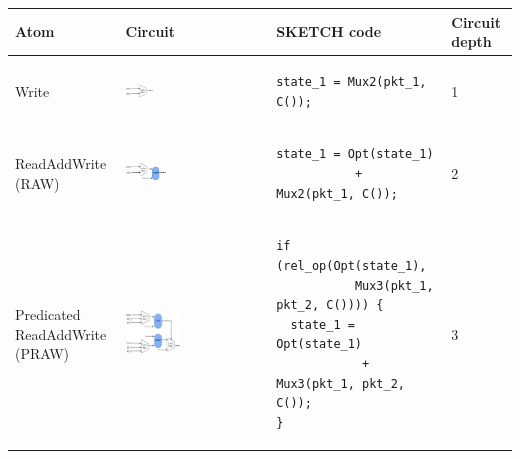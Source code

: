 \begin{scriptsize}
\begin{longtable}{|p{}|p{}|p{}|p{}|}
      \hline
      Atom & Circuit & SKETCH code & Circuit depth \\

\hline
Write &
\includegraphics[width=0.2\textwidth]{rw.pdf} &
{\begin{lstlisting}[style=customctable]
  state_1 = Mux2(pkt_1, C());
 \end{lstlisting}} &
1 \\

\hline
ReadAddWrite (RAW) &
\includegraphics[width=0.3\textwidth]{raw.pdf} &
{\begin{lstlisting}[style=customctable]
 state_1 = Opt(state_1)
           + Mux2(pkt_1, C());
 \end{lstlisting}} &
2\\

\hline
\pbox{0.1\textwidth}
{Predicated\\
ReadAddWrite (PRAW)} &
\includegraphics[width=0.4\textwidth]{pred_raw.pdf}  &
{\begin{lstlisting}[style=customctable]
if (rel_op(Opt(state_1),
           Mux3(pkt_1, pkt_2, C()))) {
  state_1 = Opt(state_1)
            + Mux3(pkt_1, pkt_2, C());
}
\end{lstlisting}} &
3\\


\end{longtable}
\end{scriptsize}
